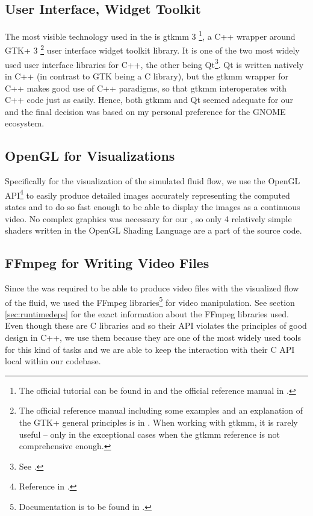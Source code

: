 \documentclass[11pt,a4paper,twoside,openright]{report}
\begin{document}
\subsection{User Interface, Widget Toolkit}
The most visible technology used in the \software{} is gtkmm 3 \footnote{The official tutorial can be found in \cite{gtkmm3} and the official reference manual in \cite{gtkmm3ref}.}, a C++ wrapper around GTK+ 3 \footnote{The official reference manual including some examples and an explanation of the GTK+ general principles is in \cite{gtk3ref}. When working with gtkmm, it is rarely useful -- only in the exceptional cases when the gtkmm reference is not comprehensive enough.} user interface widget toolkit library. It is one of the two most widely used user interface libraries for C++, the other being Qt\footnote{See \cite{qt}.}. Qt is written natively in C++ (in contrast to GTK being a C library), but the gtkmm wrapper for C++ makes good use of C++ paradigms, so that gtkmm interoperates with C++ code just as easily. Hence, both gtkmm and Qt seemed adequate for our \software{} and the final decision was based on my personal preference for the GNOME ecosystem.

\subsection{OpenGL for Visualizations}
Specifically for the visualization of the simulated fluid flow, we use the OpenGL API\footnote{Reference in \cite{openglref}.} to easily produce detailed images accurately representing the computed states and to do so fast enough to be able to display the images as a continuous video. No complex graphics was necessary for our \software{}, so only 4 relatively simple shaders written in the OpenGL Shading Language are a part of the source code.

\subsection{FFmpeg for Writing Video Files}
Since the \software{} was required to be able to produce video files with the visualized flow of the fluid, we used the FFmpeg libraries\footnote{Documentation is to be found in \cite{ffmpegdoc}.} for video manipulation. See section \ref{sec:runtimedeps} for the exact information about the FFmpeg libraries used. Even though these are C libraries and so their API violates the principles of good design in C++, we use them because they are one of the most widely used tools for this kind of tasks and we are able to keep the interaction with their C API local within our codebase.
\end{document}
